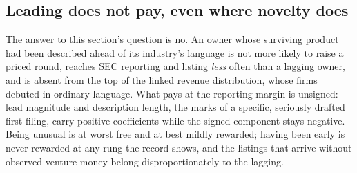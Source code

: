 \subsection{Leading does not pay, even where novelty does}\label{sec:success_conclusion}

The answer to this section's question is no. An owner whose surviving
product had been described ahead of its industry's language is not more
likely to raise a priced round, reaches SEC reporting and listing
\emph{less} often than a lagging owner, and is absent from the top of the
linked revenue distribution, whose firms debuted in ordinary language.
What pays at the reporting margin is unsigned: lead magnitude and
description length, the marks of a specific, seriously drafted first
filing, carry positive coefficients while the signed component stays
negative. Being unusual is at worst free and at best mildly rewarded;
having been early is never rewarded at any rung the record shows, and
the listings that arrive without observed venture money belong
disproportionately to the lagging.
